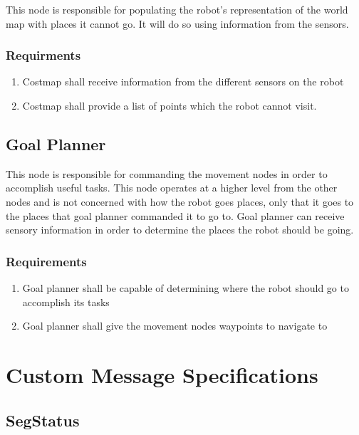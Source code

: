 This node is responsible for populating the robot's representation of the world map with places it cannot go. It will do so using information from the sensors.

  \subsubsection{Requirments}
  \begin{enumerate}
    \item Costmap shall receive information from the different sensors on the robot
    \item Costmap shall provide a list of points which the robot cannot visit.
  \end{enumerate}
       
\subsection{Goal Planner}

This node is responsible for commanding the movement nodes in order to accomplish useful tasks. This node operates at a higher level from the other nodes and is not concerned with how the robot goes places, only that it goes to the places that goal planner commanded it to go to. Goal planner can receive sensory information in order to determine the places the robot should be going.

  \subsubsection{Requirements}
  \begin{enumerate}
    \item Goal planner shall be capable of determining where the robot should go to accomplish its tasks
    \item Goal planner shall give the movement nodes waypoints to navigate to
  \end{enumerate}

\section{Custom Message Specifications}

\subsection{SegStatus}

